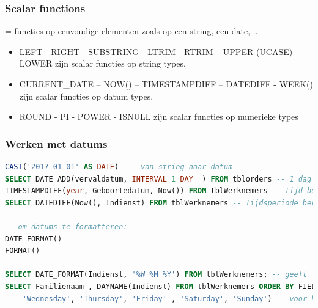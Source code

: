 \documentclass{article}
\begin{document}
\subsubsection{Scalar functions}
= functies op eenvoudige elementen zoals op een string, een date, ...

\begin{itemize}
    \item LEFT - RIGHT - SUBSTRING - LTRIM - RTRIM – UPPER (UCASE)- LOWER zijn scalar functies op string types.
    \item CURRENT\_DATE – NOW() – TIMESTAMPDIFF – DATEDIFF - WEEK() zijn scalar functies op datum types.
    \item ROUND - PI   - POWER - ISNULL zijn scalar functies op numerieke types
\end{itemize}

\subsubsection{Werken met datums}
\begin{lstlisting}[language=SQL]
CAST('2017-01-01' AS DATE)  -- van string naar datum
SELECT DATE_ADD(vervaldatum, INTERVAL 1 DAY  ) FROM tblorders -- 1 dag toevoegen aan vervaldatum
TIMESTAMPDIFF(year, Geboortedatum, Now()) FROM tblWerknemers -- tijd berekenen in aantal jaren
SELECT DATEDIFF(Now(), Indienst) FROM tblWerknemers -- Tijdsperiode berekenen ( aantal dagen in dienst):

-- om datums te formatteren:
DATE_FORMAT()
FORMAT() 

SELECT DATE_FORMAT(Indienst, '%W %M %Y') FROM tblWerknemers; -- geeft 'Friday March 1991' terug
SELECT Familienaam , DAYNAME(Indienst) FROM tblWerknemers ORDER BY FIELD(DAYNAME(Indienst),'Monday', 'Tuesday', 
    'Wednesday', 'Thursday', 'Friday' , 'Saturday', 'Sunday') -- voor het vervangen van datums naar text met FIELD()
\end{lstlisting}
\end{document}
